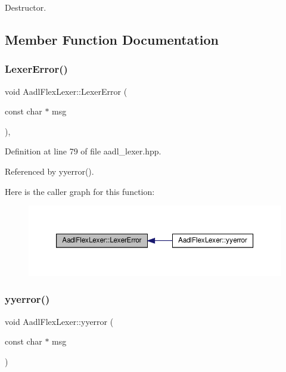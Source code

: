 Destructor. 



\subsection{Member Function Documentation}
\mbox{\label{classAadlFlexLexer_a37f8f43877e15f23a9a6068deea9e3dc}} 
\subsubsection{\texorpdfstring{Lexer\+Error()}{LexerError()}}
{\footnotesize\ttfamily void Aadl\+Flex\+Lexer\+::\+Lexer\+Error (\begin{DoxyParamCaption}\item[{const char $\ast$}]{msg }\end{DoxyParamCaption})\hspace{0.3cm}{\ttfamily [inline]}, {\ttfamily [override]}}



Definition at line 79 of file aadl\+\_\+lexer.\+hpp.



Referenced by yyerror().

Here is the caller graph for this function\+:
\nopagebreak
\begin{figure}[H]
\begin{center}
\leavevmode
\includegraphics[width=350pt]{d6/d56/classAadlFlexLexer_a37f8f43877e15f23a9a6068deea9e3dc_icgraph}
\end{center}
\end{figure}
\mbox{\label{classAadlFlexLexer_aac830c1b7622ca34e05bef9ae0689b03}} 
\subsubsection{\texorpdfstring{yyerror()}{yyerror()}}
{\footnotesize\ttfamily void Aadl\+Flex\+Lexer\+::yyerror (\begin{DoxyParamCaption}\item[{const char $\ast$}]{msg }\end{DoxyParamCaption})\hspace{0.3cm}{\ttfamily [inline]}}



